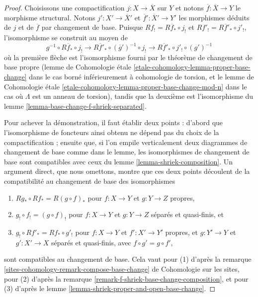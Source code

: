 \begin{proof}
Choisissons une compactification $j : X \to \overline{X}$ sur $Y$
et notons $\overline{f} : \overline{X} \to Y$ le morphisme structural.
Notons $j' : X' \to \overline{X}'$ et $\overline{f}' : \overline{X}' \to Y'$
les morphismes déduits de $j$ et de $\overline{f}$ par changement de base.
Puisque $Rf_! = R\overline{f}_* \circ j_!$ et $Rf'_! =
R\overline{f}'_* \circ j'_!$, l'isomorphisme se construit au moyen de
$$
g^{-1} \circ R\overline{f}_* \circ j_! \to
R\overline{f}'_* \circ (\overline{g}')^{-1} \circ j_! \to
R\overline{f}'_* \circ j'_! \circ (g')^{-1} 
$$
où la première flèche est l'isomorphisme fourni par le
théorème de changement de base propre (lemme de Cohomologie étale
\ref{etale-cohomology-lemma-proper-base-change} dans le cas borné inférieurement
à cohomologie de torsion, et le lemme de Cohomologie étale
\ref{etale-cohomology-lemma-proper-base-change-mod-n} dans le
cas où $\Lambda$ est un anneau de torsion), tandis que la deuxième est l'isomorphisme du
lemme \ref{lemma-base-change-f-shriek-separated}.

\medskip\noindent
Pour achever la démonstration, il faut établir deux points : d'abord que
l'isomorphisme de foncteurs ainsi obtenu ne dépend pas du
choix de la compactification ; ensuite que, si l'on empile verticalement
deux diagrammes de changement de base comme dans le lemme,
les isomorphismes de changement de base sont compatibles avec ceux
du lemme \ref{lemma-shriek-composition}.
Un argument direct, que nous omettons, montre que ces deux points découlent
de la compatibilité au changement de base des isomorphismes
\begin{enumerate}
\item $Rg_* \circ Rf_* = R(g \circ f)_*$ pour $f : X \to Y$ et $g : Y \to Z$
propres,
\item $g_! \circ f_! = (g \circ f)_!$ pour $f : X \to Y$ et $g : Y \to Z$
séparés et quasi-finis, et
\item $g_! \circ Rf'_* = Rf_* \circ g'_!$ pour $f : X \to Y$ et
$f' : X' \to Y'$ propres, et $g : Y' \to Y$ et $g' : X' \to X$
séparés et quasi-finis, avec $f \circ g' = g \circ f'$,
\end{enumerate}
sont compatibles au changement de base. Cela vaut pour (1) d'après la
remarque \ref{sites-cohomology-remark-compose-base-change} de Cohomologie sur les sites,
pour (2) d'après la remarque \ref{remark-f-shriek-base-change-composition}, et pour
(3) d'après le lemme \ref{lemma-shriek-proper-and-open-base-change}.
\end{proof}

